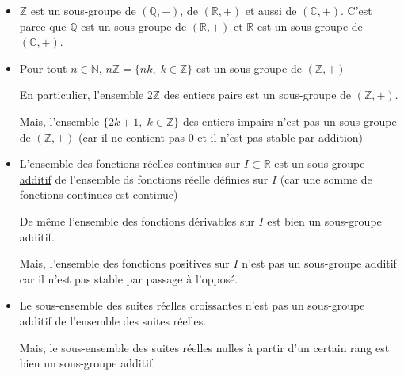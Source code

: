 \begin{Example}{}{}
\begin{itemize}

    \item $\mathbb{Z}$ est un sous-groupe de $(\mathbb{Q}, +)$, de $(\mathbb{R}, + )$ et aussi de $(\mathbb{C}, +)$. C'est parce que $\mathbb{Q}$ est un sous-groupe de $(\mathbb{R},+)$ et $\mathbb{R}$ est un sous-groupe de $(\mathbb{C}, +)$. 

    \item Pour tout $n \in \mathbb{N}$, $n \mathbb{Z} = \{ nk, \; k \in \mathbb{Z} \}$ est un sous-groupe de $(\mathbb{Z}, +)$ 

      En particulier, l'ensemble $2 \mathbb{Z}$ des entiers pairs est un sous-groupe de $(\mathbb{Z}, +)$. 

      Mais, l'ensemble $\{2k+1, \; k \in \mathbb{Z}\}$ des entiers impairs n'est pas un sous-groupe de $(\mathbb{Z}, +)$ (car il ne contient pas 0 et il n'est pas stable par addition) 

    \item L'ensemble des fonctions réelles continues sur $I \subset \mathbb{R}$ est un \underline{sous-groupe additif} de l'ensemble ds fonctions réelle définies sur $I$ (car une somme de fonctions continues est continue)

      De même l'ensemble des fonctions dérivables sur $I$ est bien un sous-groupe additif.

      Mais, l'ensemble des fonctions positives sur $I$ n'est pas un sous-groupe additif car il n'est pas stable par passage à l'opposé.

    \item Le sous-ensemble des suites réelles croissantes n'est pas un sous-groupe additif de l'ensemble des suites réelles.

      Mais, le sous-ensemble des suites réelles nulles à partir d'un certain rang est bien un sous-groupe additif.

\end{itemize}
\end{Example}

